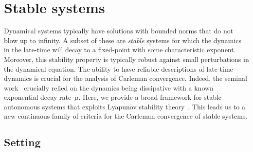 \documentclass[superscriptaddress,onecolumn,nofootinbib,longbibliography,a4paper,accepted=2026-09-29]{quantumarticle}
\theoremstyle{plain}
\theoremstyle{definition}
\numberwithin{thm}{section}
\numberwithin{assumption}{section}
\numberwithin{lemma}{section}
\numberwithin{prop}{section}
\numberwithin{cor}{section}
\numberwithin{definition}{section}
\numberwithin{rmk}{section}
\numberwithin{equation}{section}
\begin{document}
\newpage 

\section{Stable systems}
\label{sec:stable}


Dynamical systems typically have solutions with bounded norms that do not blow up to infinity. A subset of these are \emph{stable} systems for which the dynamics in the late-time will decay to a fixed-point with some characteristic exponent. Moreover, this stability property is typically robust against small perturbations in the dynamical equation. The ability to have reliable descriptions of late-time dynamics is crucial for the analysis of Carleman convergence. Indeed, the seminal work~\cite{liu2021efficient} crucially relied on the dynamics being dissipative with a known exponential decay rate~$\mu$. Here, we provide a broad framework for stable autonomous systems that exploits Lyapunov stability theory~\cite{plischke2005transient,jennings2023cost}. This leads us to a new continuous family of criteria for the Carleman convergence of stable systems.

\subsection{Setting}
\label{sec:solutionnormbounds}
\end{document}

